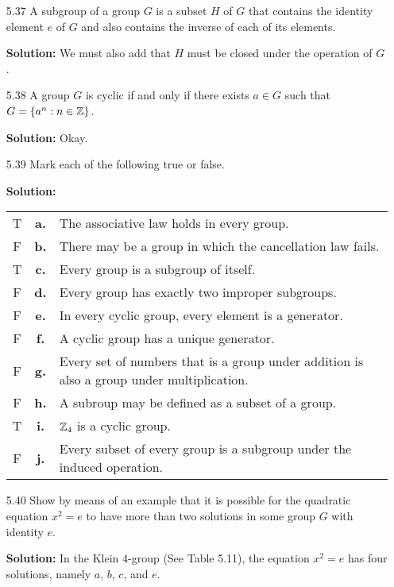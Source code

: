 \begin{enumerate}
   \item[5.37] A subgroup of a group $G$ is a subset $H$ of $G$ that contains
               the identity element $e$ of $G$ and also contains the inverse of
               each of its elements.

      \textbf{Solution:} We must also add that $H$ must be closed under the
      operation of $G$.
   \item[5.38] A group $G$ is cyclic if and only if there exists $a \in G$
               such that $G = \{a^n : n \in \mathbb{Z}\}$.

      \textbf{Solution:} Okay.
   \item[5.39] Mark each of the following true or false.

      \textbf{Solution:}

      \begin{tabularx}{\linewidth}{@{}c c X@{}} 
         T & \textbf{a.} & The associative law holds in every group. \\
         F & \textbf{b.} & There may be a group in which the cancellation law
                           fails. \\
         T & \textbf{c.} & Every group is a subgroup of itself. \\
         F & \textbf{d.} & Every group has exactly two improper subgroups. \\
         F & \textbf{e.} & In every cyclic group, every element is a
                           generator. \\
         F & \textbf{f.} & A cyclic group has a unique generator. \\
         F & \textbf{g.} & Every set of numbers that is a group under addition
                           is also a group under multiplication. \\
         F & \textbf{h.} & A subroup may be defined as a subset of a group. \\
         T & \textbf{i.} & $\mathbb{Z}_4$ is a cyclic group. \\
         F & \textbf{j.} & Every subset of every group is a subgroup under the
                           induced operation. \\
      \end{tabularx}
   \item[5.40] Show by means of an example that it is possible for the quadratic
               equation $x^2 = e$ to have more than two solutions in some group
               $G$ with identity $e$.

      \textbf{Solution:} In the Klein 4-group (See Table 5.11), the equation
      $x^2 = e$ has four solutions, namely $a$, $b$, $c$, and $e$.
\end{enumerate}

